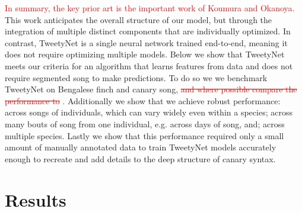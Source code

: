 \documentclass[10pt,letterpaper]{article}
\begin{document}
\textcolor{red}{In summary, the key prior art is the important work of Koumura and Okanoya\cite{koumura_automatic_2016-1}.} This work anticipates the overall structure of our model, but through the integration of multiple distinct components that are individually optimized.  In contrast, TweetyNet is a single neural network trained end-to-end, meaning it does not require optimizing multiple models. 
Below we show that TweetyNet meets our criteria for an algorithm that 
learns features from data and does not require segmented song to make predictions.
To do so we we benchmark TweetyNet on Bengalese finch and canary song, 
\textcolor{red}{\st{and where possible compare the performance to} \cite{koumura_automatic_2016-1}.}
Additionally we show that we achieve robust performance:
across songs of individuals, which can vary widely even within a species; 
across many bouts of song from one individual, e.g. across days of song, and; 
across multiple species.
Lastly we show that this performance required only a small amount of 
manually annotated data to train TweetyNet models accurately enough to recreate and add details to the deep structure of canary syntax.

\section*{Results}
\label{Results}
\end{document}
